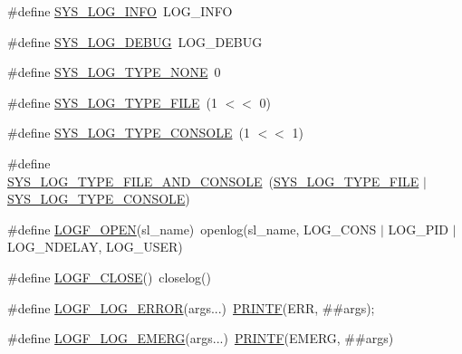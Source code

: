 \begin{DoxyCompactItemize}
\item 
\#define \hyperlink{group__SYSFRAMEWORK__LOG_gab96b18160146a1bf7d07bdafc4275ff8}{S\-Y\-S\-\_\-\-L\-O\-G\-\_\-\-I\-N\-F\-O}~L\-O\-G\-\_\-\-I\-N\-F\-O
\item 
\#define \hyperlink{group__SYSFRAMEWORK__LOG_gace24df414cb5e54d71982cf045dc63ea}{S\-Y\-S\-\_\-\-L\-O\-G\-\_\-\-D\-E\-B\-U\-G}~L\-O\-G\-\_\-\-D\-E\-B\-U\-G
\item 
\#define \hyperlink{group__SYSFRAMEWORK__LOG_ga6bacf514b7f368dde78753e6056954a0}{S\-Y\-S\-\_\-\-L\-O\-G\-\_\-\-T\-Y\-P\-E\-\_\-\-N\-O\-N\-E}~0
\item 
\#define \hyperlink{group__SYSFRAMEWORK__LOG_gab97c9812f1de694e33186d9e0e0bccba}{S\-Y\-S\-\_\-\-L\-O\-G\-\_\-\-T\-Y\-P\-E\-\_\-\-F\-I\-L\-E}~(1 $<$$<$ 0)
\item 
\#define \hyperlink{group__SYSFRAMEWORK__LOG_gaa275fbedba156a3cddd59aae2ba0a24b}{S\-Y\-S\-\_\-\-L\-O\-G\-\_\-\-T\-Y\-P\-E\-\_\-\-C\-O\-N\-S\-O\-L\-E}~(1 $<$$<$ 1)
\item 
\#define \hyperlink{group__SYSFRAMEWORK__LOG_gabcbc27505187c3c650b51ab0c4e85e7e}{S\-Y\-S\-\_\-\-L\-O\-G\-\_\-\-T\-Y\-P\-E\-\_\-\-F\-I\-L\-E\-\_\-\-A\-N\-D\-\_\-\-C\-O\-N\-S\-O\-L\-E}~(\hyperlink{group__SYSFRAMEWORK__LOG_gab97c9812f1de694e33186d9e0e0bccba}{S\-Y\-S\-\_\-\-L\-O\-G\-\_\-\-T\-Y\-P\-E\-\_\-\-F\-I\-L\-E} $\vert$ \hyperlink{group__SYSFRAMEWORK__LOG_gaa275fbedba156a3cddd59aae2ba0a24b}{S\-Y\-S\-\_\-\-L\-O\-G\-\_\-\-T\-Y\-P\-E\-\_\-\-C\-O\-N\-S\-O\-L\-E})
\item 
\#define \hyperlink{group__SYSFRAMEWORK__LOG_ga87f9c71c9333acfac7395c713bc278aa}{L\-O\-G\-F\-\_\-\-O\-P\-E\-N}(sl\-\_\-name)~openlog(sl\-\_\-name, L\-O\-G\-\_\-\-C\-O\-N\-S $\vert$ L\-O\-G\-\_\-\-P\-I\-D $\vert$ L\-O\-G\-\_\-\-N\-D\-E\-L\-A\-Y, L\-O\-G\-\_\-\-U\-S\-E\-R)
\item 
\#define \hyperlink{group__SYSFRAMEWORK__LOG_ga157cea171e54321ab6f9c649437fe237}{L\-O\-G\-F\-\_\-\-C\-L\-O\-S\-E}()~closelog()
\item 
\#define \hyperlink{group__SYSFRAMEWORK__LOG_ga7e21957264df2949a8ca0081ca66e1ad}{L\-O\-G\-F\-\_\-\-L\-O\-G\-\_\-\-E\-R\-R\-O\-R}(args...)~\hyperlink{group__SYSFRAMEWORK__LOG_gad38f8471f267bf2d5b61bff49d3f8f7f}{P\-R\-I\-N\-T\-F}(E\-R\-R, \#\#args);
\item 
\#define \hyperlink{group__SYSFRAMEWORK__LOG_gaf3a266bb9623edc69c4867d0ce8958fb}{L\-O\-G\-F\-\_\-\-L\-O\-G\-\_\-\-E\-M\-E\-R\-G}(args...)~\hyperlink{group__SYSFRAMEWORK__LOG_gad38f8471f267bf2d5b61bff49d3f8f7f}{P\-R\-I\-N\-T\-F}(E\-M\-E\-R\-G, \#\#args)

\end{DoxyCompactItemize}
